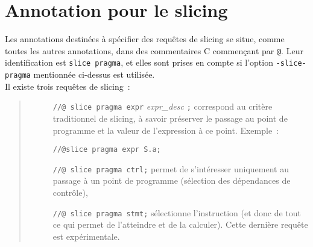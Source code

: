 \section{Annotation pour le slicing}

Les annotations destinées à spécifier des requêtes
de slicing se situe, comme toutes les autres annotations, dans des commentaires
C commençant par \verb!@!. Leur identification est \verb!slice pragma!,
et elles sont prises en compte si l'option \verb!-slice-pragma! mentionnée
ci-dessus est utilisée.\\

Il existe trois requêtes de slicing~:
\begin{quote}
\begin{description}
  \item[]\verb!//@ slice pragma expr! {\it expr\_desc} \verb!;!
    correspond au critère traditionnel de slicing, à savoir préserver le passage
    au point de programme et la valeur de l'expression à ce point. Exemple~:
    \begin{center}
    \verb!//@slice pragma expr S.a;!
    \end{center}
  \item[]\verb!//@ slice pragma ctrl;!
    permet de s'intéresser uniquement au passage à un point de programme 
    (sélection des dépendances de contrôle),
  \item[]\verb!//@ slice pragma stmt;!
    sélectionne l'instruction (et donc de tout ce qui permet de l'atteindre et
    de la calculer).
    Cette dernière requête est expérimentale.
\end{description}
\end{quote}





